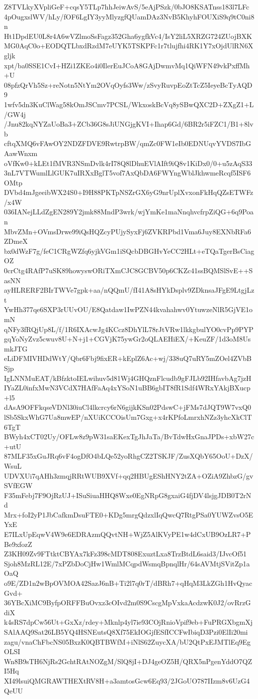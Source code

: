 Z8TVLkyXVpliGeF+cqsY5TLp7hhJeiwAvS/5eAjPSzk/0bJO8KSATnss183l7LFc
4pOugxslWV/hLy/fOF6LgIY3yyMlyzgfQUamDAz3NvB5KhyhFOUXiS9q9tC0ni8n
Ht1DpdEU0L8r4A6wVZlmoSsFagz352Gha6ygfkVc4/IsY2liL5XRZG724ZUojBXK
MG0AqC0o+EODQTLbxdRzdM7eUYK5TSKPFc1r7tlujfhi4RK1Y7xOjdUlRN6Xgljk
xpt/ba0SSE1CvI+HZi1ZKEo4i0IlerEuJCoA8GAjDwmvMq1QiWFN49vkPxffMh+U
08pfzQrVh5Sz+reNotn5NtYm2OVqOyfs3Ww/zSvyRuvpEoZtTcZ5IeyeBcTyAQD9
1wfv5dn3KuClWag58kOmJSCmv7PCSL/WkxoskBcVq8ySBwQXC2D+ZXgZ1+L/GW4j
/Jnu82kqNYZaUoBa3+ZCb36G8sJiUNGjgKVI+Ihap6Gd/6BR2r5iFZC1/B1+8lvb
cftqXMQ6vFAwOY2NDZFDVE9RwtrpBW/qmZc0FW1eIb0EDNUqvYVDS7IbGAawWnxm
oVfKw0+kLEt1fMVR3NSmDvlk4rI78Q8lDhuEVlAIft9iQ8v1KiDx0/0+u5zAqS33
3nL7VTWumlLlGUK7uIRXxBglT5vof7AxQbDA6FWYngWblJkhwmeRcqf5ISF6OMtp
DVbd4mJgeeibWX24S0+I9H88PKTpNSZrGX6yG9nrUplXvxonFkHqQZsETWFz/x4W
036IANejLLdZgEN289Y2jmk88MndP3wrk/wjYmKe1maNnqhvcfrpZiQG+6q9Poan
MbvZMn+OVmsDrwe99iQsHQZcyPUjySyxFj6ZVKRPbd1Vma6Juy8EXNbRFa6ZDmeX
bx0dWzF7g/feC1CRgWZfq6yjkVGm1iSQcbDBGHvYeCC2HLt+eTQaTgerBsCiagOZ
0crCtg4RAfP7uSK89howyswORiTXmCJC8GCBV50p6CKZc41ssBQMSlSvE++SasNN
ayHLRERF2BIrTWVe7gpk+aa/nQQmU/fI41A8sHYkDsplv9ZDknsaJFgE9LtgjLzt
YwHh377qe6SXP3rUUvOU/E8Qatdaw1IwPZN44kvahahwv0YtuwzeNlR5GjVE1omN
qNFy3fRQjUp8L/f/1R6IXAcwJg4KCcz8DhYlL78rJtVRw1lkkgbulYO0cvPp9PYP
gqYoNyZvz5cwuv8U+N+j1+CGVjK75ywGr2oQLAEHiEX/+KeuZF/1d3oM8UsmkJTG
eLiDFMIVHDdWtY/Qbr6Fbj9fixER+kEplZ6Ac+wj/338uQ7uRY5mZOel4ZVbBSjp
IgLNNMuEAT/kBfzktoIELwihuv5d81Wj4GHQznFlcudb9gFJLb92IHfavbAg7jzH
IYaZL0infxMwN3VCdX7HAfFaAq4xYSoN1uBB6gbIT8fR1Sdf4WRxYAkjBXucp+l5
dAsA9OFFkqseVDNl30iuCl4lkcrcy6rN6gijkKSn02PdswC+jFMs7dJQT9W7vxQ0
lSb5SkxWhG7Ua8mwEP/nXUiKCCOisUm7Gxg+x4rKPfoLmrxhNZz3yhcXkClT6TgT
BWyh4xCT02Uy/OFLw8z9pW31saEKexTgJhJaTa/BvTdwHxGnaJPDs+xbW27c+utU
87MLF35xGuJRq6vF4ogDfO4bLQe52yoRhgCZ2TSKJF/ZusXQbY65OoU+DzX/WsuL
UDVXUi7qAHh3zmqjRRtWUB9XVf+qq2HBUgEShHNY2tZA+OZiA9ZhbzG/gvSVfEGW
F35mFebj7F9OjRzUJ+ISuSiuaHHQ8Wxe0EgNRpG8gxaiG4fjDV4lsjgJDB0T2rNd
Mrx+foI2yP1JbCafkmDsuFTE0+KDg5mrgQdzxlIqQwcQ7RtgPSa0YUWZvsO5EYxE
E7ILxUpEqwV4W9e6EDRAzmQQvtNH+WjZ5AlKVyPE1w4dCxUB9OzLR7+PBe9xfozZ
Z3KH09Zv9FTtktCBYAx7kFz398cMDT808ExuztLxa8TrzBtdL6said3/IJvcOf51
Sjoh8MzRL12E/7xPZbDoCjHw1WmlMCqpdWsmqBpnqlHr/64sAVMtjSVitZp1aOaQ
o9E/ZD1n2wBpOVMOA42SazJ6nB+Ti2l7q0rT/dBRh7+qHqM3LkZGh1HvQyacGvd+
36YBcXiMC9ByfpORFFBuOvxz3cOIvd2m0S9CscgMpVxkaAcdzwK0J2/ovRrzGdiX
k4sRS7dpCw56Ut+GxXz/rdey+Mknlp4yl7ie93COjRnioVpif9eb+FuPRGXbgmXj
SAlAAQ9Sat26LB5YQ4HSNEutsQ8Xf75EkIOGjfESfICCFwIbiqD3Pzi0ElIi20mi
zagu/vnaChFbcNS05BxzK0QBTBWfM+iNlS62ZuycXA/bU2QtPxEJMTlEq9EgOLSI
Wn8B9sTH6NjRs2GchtRAtNOZgM/SlQ8jI+DJ4geOZ5H/QRX5nPgenYddO7QZI5Hq
XI49lsuiQMGRAWTHEXtRV8H+a3amtosGcw6Eq93/2JGoUO787IIzm8v6UzG4QeUU
